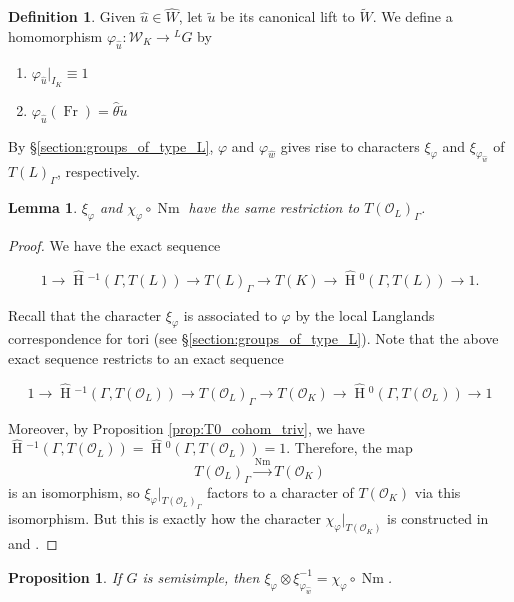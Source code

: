\documentclass[11pt]{amsart}
\theoremstyle{plain}
\newtheorem{proposition}[theorem]{Proposition}
\newtheorem{lemma}[theorem]{Lemma}
\newcommand{\HT}[1]{\hat{\HH}{}^{#1}}
\theoremstyle{definition}
\newtheorem{definition}[theorem]{Definition}
\DeclareMathOperator{\HH}{H}
\DeclareMathOperator{\Nm}{Nm}
\DeclareMathOperator{\Fr}{Fr}
\newcommand{\OK}{\mathcal{O}_K}
\newcommand{\OL}{\mathcal{O}_L}
\newcommand{\Weil}{\mathcal{W}}
\begin{document}
\begin{definition}
Given $\hat{u} \in \hat{W}$, let $\tilde{u}$ be its canonical lift to $\widetilde{W}$.
We define a homomorphism $\varphi_{\hat{u}} : \Weil_K \rightarrow {}^L G$ by
\begin{enumerate}
\item $\varphi_{\hat{u}}|_{I_K} \equiv 1$
\item $\varphi_{\hat{u}}(\Fr) = \hat{\theta} \tilde{u}$
\end{enumerate}
\end{definition}

By
\S\ref{section:groups_of_type_L}, $\varphi$ and $\varphi_{\hat{w}}$ gives rise to characters
$\xi_{\varphi}$ and $\xi_{\varphi_{\hat{w}}}$ of $T(L)_{\Gamma}$, respectively.

\begin{lemma} \label{lem:GDR_compat}
$\xi_{\varphi}$ and $\chi_{\varphi} \circ \Nm$ have the same restriction to $T(\OL)_{\Gamma}$.
\end{lemma}

\begin{proof}
We have the exact sequence

$$1 \rightarrow \HT{-1}(\Gamma, T(L)) \rightarrow T(L)_{\Gamma} \rightarrow T(K)
  \rightarrow \HT{0}(\Gamma, T(L)) \rightarrow 1.$$

Recall that the character $\xi_{\varphi}$ is associated to $\varphi$ by
the local Langlands correspondence for tori (see \S\ref{section:groups_of_type_L}).
Note that the above exact sequence restricts to an exact sequence

$$1 \rightarrow \HT{-1}(\Gamma, T(\OL)) \rightarrow T(\OL)_{\Gamma}
  \rightarrow T(\OK) \rightarrow \HT{0}(\Gamma, T(\OL)) \rightarrow 1$$

Moreover, by Proposition \ref{prop:T0_cohom_triv}, we have
$\HT{-1}(\Gamma, T(\OL)) = \HT{0}(\Gamma, T(\OL)) = 1$.
Therefore, the map
$$T(\OL)_{\Gamma} \xrightarrow{\Nm} T(\OK)$$
is an isomorphism, so
$\xi_{\varphi}|_{T(\OL)_{\Gamma}}$ factors to a character of
$T(\OK)$ via this isomorphism.  But this is exactly how the character
$\chi_{\varphi}|_{T(\OK)}$ is constructed in \cite{reeder-debacker:09a} and \cite{reeder:08a}.
\end{proof}

\begin{proposition}\label{existenceofrectifier}
If $G$ is semisimple, then $\xi_{\varphi} \otimes \xi_{\varphi_{\hat{w}}}^{-1} = \chi_{\varphi} \circ \Nm$.
\end{proposition}
\end{document}
